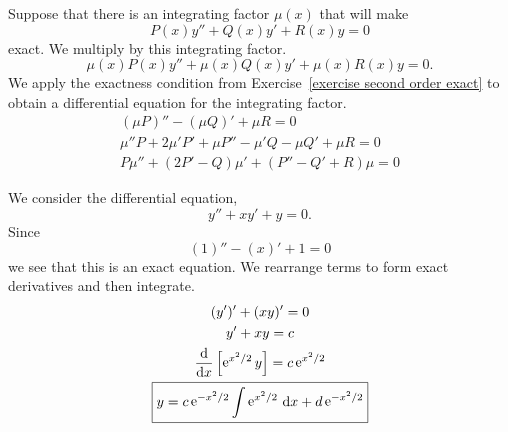   

\begin{Solution}
  \label{solution second order integrating factor}
  Suppose that there is an integrating factor $\mu(x)$ that will make 
  \[
  P(x) y'' + Q(x) y' + R(x) y = 0
  \]
  exact.  We multiply by this integrating factor.
  \begin{equation}
    \label{2nd_lin_hom_de_int_fac}
    \mu(x) P(x) y'' + \mu(x) Q(x) y' + \mu(x) R(x) y = 0.
  \end{equation}
  We apply the exactness condition from 
  Exercise~\ref{exercise second order exact} to obtain a differential
  equation for the integrating factor.
  \begin{gather*}
    (\mu P)'' - (\mu Q)' + \mu R = 0
    \\
    \mu'' P + 2 \mu' P' + \mu P'' - \mu' Q - \mu Q' + \mu R = 0
    \\
    \boxed{
      P \mu'' + (2 P' - Q) \mu' + (P'' - Q' + R) \mu = 0
      }
  \end{gather*}
\end{Solution}





\begin{Solution}
  \label{solution yxyy=0}
  We consider the differential equation,
  \[
  y'' + x y' + y = 0.
  \]
  Since
  \[
  (1)'' - (x)' + 1 = 0
  \]
  we see that this is an exact equation.  We rearrange terms to form 
  exact derivatives and then integrate.
  \begin{gather*}
    (y')' + (x y)' = 0 \\
    y' + x y = c \\
    \frac{\mathrm{d}}{\mathrm{d} x} \left[ \mathop{\mathrm{e}}\nolimits^{x^2 / 2} y \right] = c \mathop{\mathrm{e}}\nolimits^{x^2 / 2} \\
    \boxed{
      y = c \mathop{\mathrm{e}}\nolimits^{-x^2 / 2} \int \mathop{\mathrm{e}}\nolimits^{x^2 / 2}\,\mathrm{d} x + d \mathop{\mathrm{e}}\nolimits^{-x^2 / 2}
      }
  \end{gather*}
\end{Solution}





